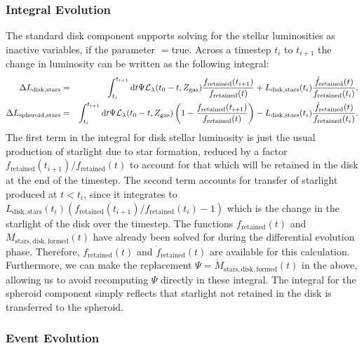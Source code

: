 \subsubsection{Integral Evolution}

The standard disk component supports solving for the stellar luminosities as inactive variables, if the parameter {\normalfont \ttfamily [diskLuminositiesStellarInactive]}$=${\normalfont \ttfamily true}. Across a timestep $t_i$ to $t_{i+1}$ the change in luminosity can be written as the following integral:
\begin{eqnarray}
\Delta L_\mathrm{disk, stars} &=& \int_{t_{i}}^{t_{i+1}} \mathrm{d}t \Psi \mathcal{L}_\lambda(t_0-t,Z_\mathrm{gas}) {f_\mathrm{retained}(t_{i+1}) \over f_\mathrm{retained}(t)}  + L_\mathrm{disk, stars}(t_i) {\dot{f}_\mathrm{retained}(t) \over f_\mathrm{retained}(t_{i})}, \\
\Delta L_\mathrm{spheroid, stars} &=& \int_{t_{i}}^{t_{i+1}} \mathrm{d}t  \Psi \mathcal{L}_\lambda(t_0-t,Z_\mathrm{gas}) \left( 1 - {f_\mathrm{retained}(t_{i+1}) \over f_\mathrm{retained}(t)} \right) - L_\mathrm{disk, stars}(t_i) {\dot{f}_\mathrm{retained}(t) \over f_\mathrm{retained}(t_{i})}. \\
\end{eqnarray}
The first term in the integral for disk stellar luminosity is just the usual production of starlight due to star formation, reduced by a factor $f_\mathrm{retained}(t_{i+1}) / f_\mathrm{retained}(t)$ to account for that which will be retained in the disk at the end of the timestep. The second term accounts for transfer of starlight produced at $t<t_i$, since it integrates to $L_\mathrm{disk, stars}(t_i) (f_\mathrm{retained}(t_{i+1}) / f_\mathrm{retained}(t_{i}) - 1)$ which is the change in the starlight of the disk over the timestep. The functions $f_\mathrm{retained}(t)$ and $M_\mathrm{stars, disk, formed}(t)$ have already been solved for during the differential evolution phase. Therefore, $f_\mathrm{retained}(t)$ and $\dot{f}_\mathrm{retained}(t)$ are available for this calculation. Furthermore, we can make the replacement $\Psi = \dot{M}_\mathrm{stars, disk, formed}(t)$ in the above, allowing us to avoid recomputing $\Psi$ directly in these integral. The integral for the spheroid component simply reflects that starlight not retained in the disk is transferred to the spheroid.

\subsubsection{Event Evolution}

